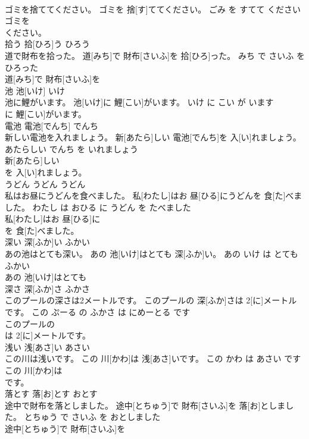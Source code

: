 \documentclass[8pt]{extreport}
\begin{document}
\begin{CJK}{UTF8}{min}
\\	ゴミを捨ててください。	ゴミを 捨[す]ててください。	ごみ を すてて ください	
\\	ゴミを
\\	ください。			
\\	拾う	拾[ひろ]う	ひろう	
\\	道で財布を拾った。	道[みち]で 財布[さいふ]を 拾[ひろ]った。	みち で さいふ を ひろった	
\\	道[みち]で 財布[さいふ]を
\\	池	池[いけ]	いけ	
\\	池に鯉がいます。	池[いけ]に 鯉[こい]がいます。	いけ に こい が います	
\\	に 鯉[こい]がいます。			
\\	電池	電池[でんち]	でんち	
\\	新しい電池を入れましょう。	新[あたら]しい 電池[でんち]を 入[い]れましょう。	あたらしい でんち を いれましょう	
\\	新[あたら]しい
\\	を 入[い]れましょう。			
\\	うどん	うどん	うどん	
\\	私はお昼にうどんを食べました。	私[わたし]はお 昼[ひる]にうどんを 食[た]べました。	わたし は おひる に うどん を たべました	
\\	私[わたし]はお 昼[ひる]に
\\	を 食[た]べました。			
\\	深い	深[ふか]い	ふかい	
\\	あの池はとても深い。	あの 池[いけ]はとても 深[ふか]い。	あの いけ は とても ふかい	
\\	あの 池[いけ]はとても
\\	深さ	深[ふか]さ	ふかさ	
\\	このプールの深さは2メートルです。	このプールの 深[ふか]さは 2[に]メートルです。	この ぷーる の ふかさ は にめーとる です	
\\	このプールの
\\	は 2[に]メートルです。			
\\	浅い	浅[あさ]い	あさい	
\\	この川は浅いです。	この 川[かわ]は 浅[あさ]いです。	この かわ は あさい です	
\\	この 川[かわ]は
\\	です。			
\\	落とす	落[お]とす	おとす	
\\	途中で財布を落としました。	途中[とちゅう]で 財布[さいふ]を 落[お]としました。	とちゅう で さいふ を おとしました	
\\	途中[とちゅう]で 財布[さいふ]を

\end{CJK}
\end{document}
